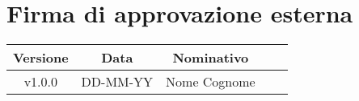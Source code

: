 \section*{Firma di approvazione esterna}
    \begin{table}[!ht]
        \centering
        \renewcommand{\arraystretch}{1.5}
        \begin{tabularx}{0.98\textwidth}
            {c c c >{\centering\arraybackslash}X X}
            \rowcolor{black}
            \textbf{\color{white} Versione} & \textbf{\color{white} Data} & \textbf{\color{white} Nominativo} & \multicolumn{2}{c}{\textbf{\color{white} Firma}}\\ 
            \hline
            
            \multirow{2}{*}{v1.0.0} &\multirow{2}{*}{DD-MM-YY} &\multirow{2}{*}{Nome Cognome} &&\\

            &&&\multicolumn{2}{c}{\hrulefill}\\
            \hline
        \end{tabularx}
    \end{table}